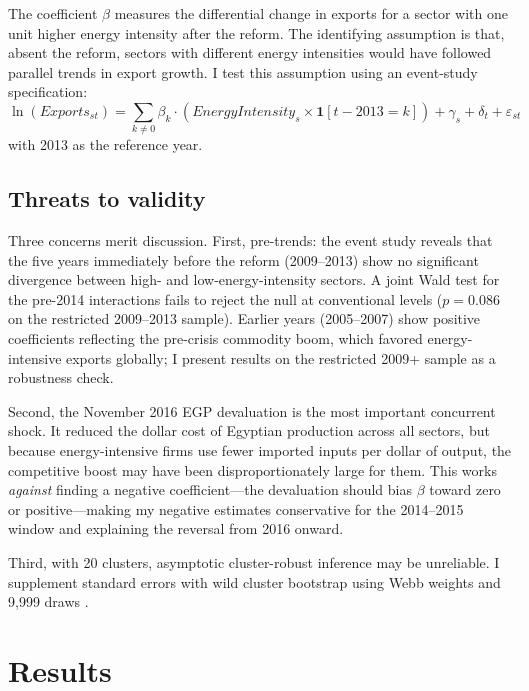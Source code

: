 \documentclass[12pt]{article}
\begin{document}
The coefficient $\beta$ measures the differential change in exports for a sector with one unit higher energy intensity after the reform. The identifying assumption is that, absent the reform, sectors with different energy intensities would have followed parallel trends in export growth. I test this assumption using an event-study specification:
\begin{equation}
\ln(Exports_{st}) = \sum_{k \neq 0} \beta_k \cdot (EnergyIntensity_s \times \mathbf{1}[t - 2013 = k]) + \gamma_s + \delta_t + \varepsilon_{st}
\label{eq:event}
\end{equation}
with 2013 as the reference year.

\subsection{Threats to validity}

Three concerns merit discussion. First, pre-trends: the event study reveals that the five years immediately before the reform (2009--2013) show no significant divergence between high- and low-energy-intensity sectors. A joint Wald test for the pre-2014 interactions fails to reject the null at conventional levels ($p = 0.086$ on the restricted 2009--2013 sample). Earlier years (2005--2007) show positive coefficients reflecting the pre-crisis commodity boom, which favored energy-intensive exports globally; I present results on the restricted 2009+ sample as a robustness check.

Second, the November 2016 EGP devaluation is the most important concurrent shock. It reduced the dollar cost of Egyptian production across all sectors, but because energy-intensive firms use fewer imported inputs per dollar of output, the competitive boost may have been disproportionately large for them. This works \textit{against} finding a negative coefficient---the devaluation should bias $\beta$ toward zero or positive---making my negative estimates conservative for the 2014--2015 window and explaining the reversal from 2016 onward.

Third, with 20 clusters, asymptotic cluster-robust inference may be unreliable. I supplement standard errors with wild cluster bootstrap using Webb weights and 9,999 draws \citep{cameron2008bootstrap, roodman2019fast}.

\section{Results}
\end{document}
